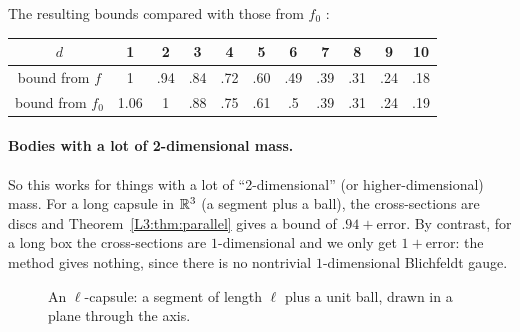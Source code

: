 The resulting bounds compared with those from $f_0$ :
\begin{center}
\begin{tabular}{c|cccccccccc}
\toprule
$d$ & 1 & 2 & 3 & 4 & 5 & 6 & 7 & 8 & 9 & 10\\
\midrule
bound from $f$ & 1 & .94 & .84 & .72 & .60 & .49 & .39 & .31 & .24 & .18\\
bound from $f_0$ & 1.06 & 1 & .88 & .75 & .61 & .5 & .39 & .31 & .24 & .19\\
\bottomrule
\end{tabular}
\end{center}

\paragraph{Bodies with a lot of 2-dimensional mass.}
So this works for things with a lot of ``2-dimensional'' (or higher-dimensional) mass. For a long capsule in $\mathbb{R}^3$
(a segment plus a ball), the cross-sections are discs and Theorem~\ref{L3:thm:parallel} gives a bound of $.94+\text{error}$.
By contrast, for a long box  the cross-sections are $1$-dimensional and we only get $1+\text{error}$: the method gives
nothing, since there is no nontrivial $1$-dimensional Blichfeldt gauge.

\begin{figure}[ht]
\centering
{}
\caption{An $\ell$-capsule: a segment of length $\ell$ plus a unit ball, drawn in a plane through the axis.}
\label{L3:fig:capsule}
\end{figure}

